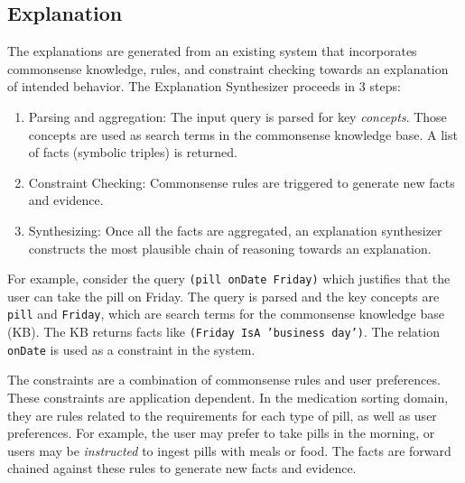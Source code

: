 \documentclass[letterpaper]{article} %
\begin{document}




\subsection{Explanation}
The explanations are generated from an existing
system \cite{gilpin2018monitoring,leilanithesis} that incorporates commonsense
knowledge, rules, and constraint checking towards an explanation of
intended behavior.  The Explanation Synthesizer proceeds in 3 steps:
\begin{enumerate}
\item Parsing and aggregation: The input query is parsed for key \emph{concepts}.  Those
concepts are used as search terms in the commonsense knowledge base.  A list of facts (symbolic triples) is returned.
\item Constraint Checking: Commonsense rules are triggered to generate
new facts and evidence.
\item Synthesizing: Once all the facts are aggregated, an explanation
synthesizer constructs the most plausible chain of reasoning
towards an explanation.
\end{enumerate}

For example, consider the query \texttt{(pill onDate Friday)} which justifies that the user can take the pill on Friday.  The query is parsed and
the key concepts are \texttt{pill} and \texttt{Friday}, which are search terms for
the commonsense knowledge base (KB).  The KB returns facts like
\texttt{(Friday IsA 'business day')}.  The relation \texttt{onDate} is
used as a constraint in the system.

The constraints are a combination of commonsense rules and user
preferences.  These constraints are application dependent.   In the
medication sorting domain, they are rules related to the requirements
for each type of pill, as well as user preferences.  For example, the
user may prefer to take pills in the morning, or users may be
\emph{instructed} to ingest pills with meals or food.  The facts are
forward chained against these rules to generate new facts and
evidence.
\end{document}
